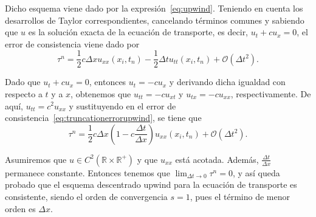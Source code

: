 \begin{frame}
    \frametitle{\secname}

    \begin{example}
        Dicho esquema viene dado por la expresión~\eqref{eq:upwind}.
        Teniendo en cuenta los desarrollos de Taylor correspondientes,
        cancelando términos comunes y sabiendo que $u$ es la solución
        exacta de la ecuación de transporte, es decir,
        $u_{t}+cu_{x}=0$, el error de consistencia viene dado por
        \begin{equation}\label{eq:truncationerrorupwind}
            \tau^{n}=
            \frac{1}{2}
            c\Delta x
            u_{xx}
            \left(x_{i},t_{n}\right)-
            \frac{1}{2}\Delta t
            u_{tt}
            \left(x_{i},t_{n}\right)+
            \mathcal{O}
            \left(\Delta t^{2}\right).
        \end{equation}

        Dado que $u_{t}+cu_{x}=0$, entonces $u_{t}=-cu_{x}$ y derivando
        dicha igualdad con respecto a $t$ y a $x$, obtenemos que
        $u_{tt}=-cu_{xt}$ y $u_{tx}=-cu_{xx}$, respectivamente.
        De aquí, $u_{tt}=c^{2}u_{xx}$ y sustituyendo en el error de
        consistencia~\eqref{eq:truncationerrorupwind}, se tiene que
        \begin{equation*}
            \tau^{n}=
            \frac{1}{2}
            c\Delta x
            \left(
            1-c\frac{\Delta t}{\Delta x}
            \right)
            u_{xx}
            \left(x_{i},t_{n}\right)+
            \mathcal{O}
            \left(\Delta t^{2}\right).
        \end{equation*}

        Asumiremos que
        \begin{math}
            u\in
            C^{2}
            \left(
            \mathbb{R}\times
            \mathbb{R}^{+}
            \right)
        \end{math}
        y que $u_{xx}$ está acotada.
        Además, $\frac{\Delta t}{\Delta x}$ permanece constante.
        Entonces tenemos que $\lim_{\Delta t\to0}\tau^{n}=0$, y así queda
        probado que el esquema descentrado upwind para la
        ecuación de transporte es consistente, siendo el orden de
        convergencia $s=1$, pues el término de menor orden es $\Delta x$.
    \end{example}
\end{frame}

